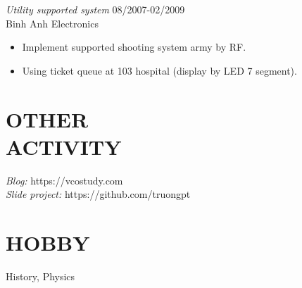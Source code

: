 \documentclass[margin]{res}
\begin{document}
\begin{resume}
                {\sl Utility supported system} \hfill        08/2007-02/2009 \\
                Binh Anh Electronics
                  \begin{itemize}
                   \item Implement supported shooting system army by RF.
                   \item Using ticket queue at 103 hospital (display by LED 7 segment).
                   \end{itemize} 
 
\section{OTHER \\ ACTIVITY}  
{\sl Blog:} https://vcostudy.com \\
{\sl Slide project:} https://github.com/truongpt
\section{HOBBY}  History, Physics


\end{resume}
\end{document}
